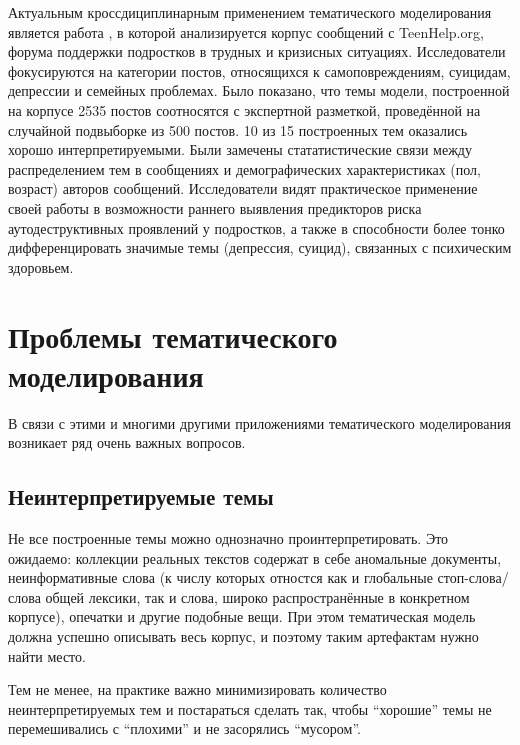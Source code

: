 Актуальным кроссдициплинарным применением тематического моделирования является работа \cite{franz2020using}, в которой анализируется корпус сообщений с TeenHelp.org, форума  поддержки подростков в трудных и кризисных ситуациях. Исследователи фокусируются на категории постов, относящихся к самоповреждениям, суицидам, депрессии и семейных проблемах. Было показано, что темы модели, построенной на корпусе 2535 постов соотносятся с экспертной разметкой, проведённой на случайной подвыборке из 500 постов. 10 из 15 построенных тем оказались хорошо интерпретируемыми. Были замечены стататистические связи между распределением тем в сообщениях и демографических характеристиках (пол, возраст) авторов сообщений. 
Исследователи видят практическое применение своей работы в возможности раннего выявления предикторов риска аутодеструктивных проявлений у подростков, а также в способности более тонко дифференцировать значимые темы (депрессия, суицид), связанных с психическим здоровьем. 




\section{Проблемы тематического моделирования}

В связи с этими и многими другими приложениями тематического моделирования возникает ряд очень важных вопросов.

\subsection{Неинтерпретируемые темы}

Не все построенные темы можно однозначно проинтерпретировать. Это ожидаемо: коллекции реальных текстов содержат в себе аномальные документы, неинформативные слова (к числу которых отностся как и глобальные стоп-слова/слова общей лексики, так и слова, широко распространённые в конкретном корпусе), опечатки и другие подобные вещи. При этом тематическая модель должна успешно описывать весь корпус, и поэтому таким артефактам нужно найти место.

Тем не менее, на практике важно минимизировать количество неинтерпретируемых тем и постараться сделать так, чтобы ``хорошие'' темы не перемешивались с ``плохими'' и не засорялись ``мусором''.


